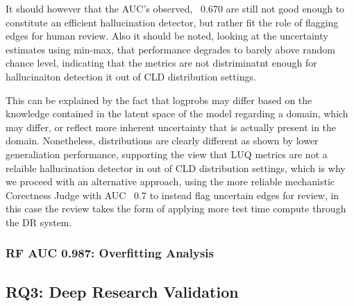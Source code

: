 
It should however that the AUC's observed, ~0.670 are still not good enough to constitute an efficient hallucination detector, but rather fit the role of flagging edges for human review. Also it should be noted, looking at the uncertainty estimates using min-max, that performance degrades to barely above random chance level, indicating that the metrics are not distriminatnt enough for hallucinaiton detection it out of CLD distribution settings.


This can be explained by the fact that logprobs may differ based on the knowledge contained in the latent space of the model regarding a domain, which may differ, or reflect more inherent uncertainty that is actually present in the domain. Nonetheless, distributions are clearly different as shown by lower generaliation performance, supporting the view that LUQ metrics are not a relaible hallucination detector in out of CLD distribution settings, which is why we proceed with an alternative approach, using the more reliable mechanistic Corectness  Judge with AUC ~0.7 to instead flag uncertain edges for review, in this case the review takes the form of applying more test time compute through the DR system.

\subsubsection{RF AUC 0.987: Overfitting Analysis}

\subsection{RQ3: Deep Research Validation}
\label{sec:discussion_rq3}


